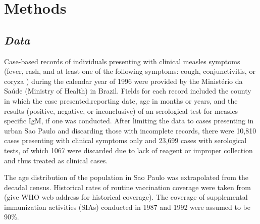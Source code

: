 \section{\texorpdfstring{\textbf{Methods}}{Methods}}\label{methods}

\subsection{\texorpdfstring{\emph{Data}}{Data}}\label{data}

Case-based records of individuals presenting with clinical measles symptoms (fever, rash, and at least one of the following symptoms: cough,
conjunctivitis, or coryza \cite{Hutchins_2004}) during the calendar year of 1996 were provided by the Ministério da Saúde (Ministry of Health) in Brazil. Fields for each record included the county in which the case presented,reporting date, age in months or years, and the results (positive, negative, or inconclusive) of an serological test for measles specific IgM, if one was conducted. After limiting the data to cases presenting in urban Sao Paulo and discarding those with incomplete records, there were 10,810 cases presenting with clinical symptoms only
and 23,699 cases with serological tests, of which 1067 were discarded due to lack of reagent or improper collection and thus treated as clinical cases.

The age distribution of the population in Sao Paulo was extrapolated from the decadal census. Historical rates of routine vaccination coverage were taken from (give WHO web address for historical coverage). The coverage of supplemental immunization activities (SIAs) conducted in 1987 and 1992 were assumed to be 90\%.
